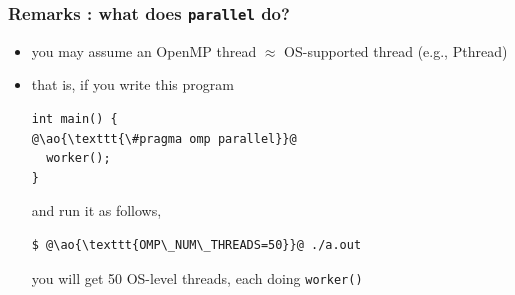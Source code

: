 \documentclass[12pt,dvipdfmx]{beamer}
\newcommand{\ao}[1]{{\color{blue}#1}}
\begin{document}

\begin{frame}[fragile]
\frametitle{Remarks : what does \texttt{parallel} do?}
\begin{itemize}
\item you may assume an OpenMP thread $\approx$ OS-supported 
  thread (e.g., Pthread)

\item that is, if you write this program
\begin{lstlisting}
int main() {
@\ao{\texttt{\#pragma omp parallel}}@
  worker();
}
\end{lstlisting}
and run it as follows,
\begin{lstlisting}
$ @\ao{\texttt{OMP\_NUM\_THREADS=50}}@ ./a.out
\end{lstlisting} %
you will get 50 OS-level threads, each doing {\tt worker()}
\end{itemize}
\end{frame}
\end{document}
